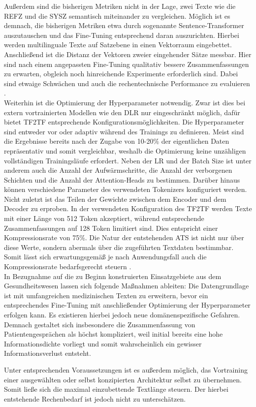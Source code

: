 \noindent
Außerdem sind die bisherigen Metriken nicht in der Lage, zwei Texte wie die \ac{REFZ} und die \ac{SYSZ} semantisch miteinander zu vergleichen. Möglich ist es demnach, die bisherigen Metriken etwa durch sogenannte Sentence-Transformer auszutauschen und das Fine-Tuning entsprechend daran auszurichten. Hierbei werden multilinguale Texte auf Satzebene in einen Vektorraum eingebettet. Anschließend ist die Distanz der Vektoren zweier eingehender Sätze messbar. Hier sind nach einem angepassten Fine-Tuning qualitativ bessere Zusammenfassungen zu erwarten, obgleich noch hinreichende Experimente erforderlich sind. Dabei sind etwaige Schwächen und auch die rechentechnische Performance zu evaluieren \cite{FEN20}.\\

\noindent
Weiterhin ist die Optimierung der Hyperparameter notwendig. Zwar ist dies bei extern vortrainierten Modellen wie den \ac{DLR} nur eingeschränkt möglich, dafür bietet \ac{TF2TF} entsprechende Konfigurationsmöglichkeiten. Die Hyperparameter sind entweder vor oder adaptiv während des Trainings zu definieren. Meist sind die Ergebnisse bereits nach der Zugabe von 10-20\% der eigentlichen Daten repräsentativ und somit vergleichbar, weshalb die Optimierung keine unzähligen vollständigen Trainingsläufe erfordert. Neben der \ac{LR} und der Batch Size ist unter anderem auch die Anzahl der Aufwärmschritte, die Anzahl der verborgenen Schichten und die Anzahl der Attention-Heads zu bestimmen. Darüber hinaus können verschiedene Parameter des verwendeten Tokenizers konfiguriert werden. Nicht zuletzt ist das Teilen der Gewichte zwischen dem Encoder und dem Decoder zu erproben. In der verwendeten Konfiguration des \ac{TF2TF} werden Texte mit einer Länge von 512 Token akzeptiert, während entsprechende Zusammenfassungen auf 128 Token limitiert sind. Dies entspricht einer Kompressionsrate von 75\%. Die Natur der entstehenden \ac{ATS} ist nicht nur über diese Werte, sondern abermals über die zugeführten Textdaten bestimmbar. Somit lässt sich erwartungsgemäß je nach Anwendungsfall auch die Kompressionsrate bedarfsgerecht steuern \cite[S.~14-15]{NIT19}.\\

\noindent
In Bezugnahme auf die zu Beginn konstruierten Einsatzgebiete aus dem Gesundheitswesen lassen sich folgende Maßnahmen ableiten: Die Datengrundlage ist mit umfangreichen medizinischen Texten zu erweitern, bevor ein entsprechendes Fine-Tuning mit anschließender Optimierung der Hyperparameter erfolgen kann. Es existieren hierbei jedoch neue domänenspezifische Gefahren. Demnach gestaltet sich insbesondere die Zusammenfassung von Patientengesprächen als höchst kompliziert, weil initial bereits eine hohe Informationsdichte vorliegt und somit wahrscheinlich ein gewisser Informationsverlust entsteht.
\newpage

\noindent
Unter entsprechenden Voraussetzungen ist es außerdem möglich, das Vortraining einer ausgewählten oder selbst konzipierten Architektur selbst zu übernehmen. Somit ließe sich die maximal einzubettende Textlänge steuern. Der hierbei entstehende Rechenbedarf ist jedoch nicht zu unterschätzen.
